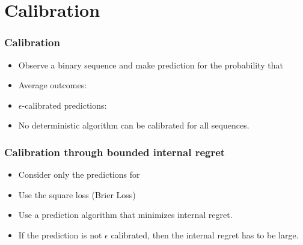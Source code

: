 \documentclass{beamer}
\begin{document}
\section{Calibration}
\begin{frame}
\frametitle{Calibration}
\begin{itemize}
\item Observe a binary sequence  and make
  prediction  for the probability that 
\item Average outcomes: 
\item $\epsilon$-calibrated predictions:
\item No deterministic algorithm can be calibrated for all sequences.
\end{itemize}
\end{frame}

\begin{frame}
\frametitle{Calibration through bounded internal regret}
\begin{itemize}
\item Consider only the predictions  for 
\item Use the square loss (Brier Loss) 
\item Use a prediction algorithm that minimizes internal regret.
\item If the prediction is not $\epsilon$ calibrated, then the
  internal regret has to be large.
\end{itemize}
\end{frame}

\newcommand{\bp}{{\bf p}}
\end{document}
